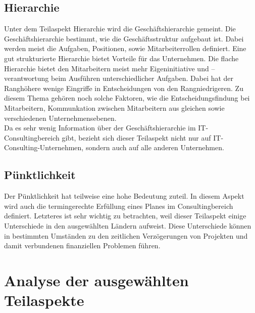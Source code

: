 \subsection*{Hierarchie}
Unter dem Teilaspekt Hierarchie wird die Geschäftshierarchie gemeint. Die Geschäftshierarchie bestimmt, wie die Geschäftsstruktur aufgebaut ist. Dabei werden meist die Aufgaben, Positionen, sowie Mitarbeiterrollen definiert. Eine gut strukturierte Hierarchie bietet Vorteile für das Unternehmen. Die flache Hierarchie bietet den Mitarbeitern meist mehr Eigeninitiative und –verantwortung beim Ausführen unterschiedlicher Aufgaben. Dabei hat der Ranghöhere wenige Eingriffe in  Entscheidungen von den Rangniedrigeren.
Zu diesem Thema gehören noch solche Faktoren, wie die Entscheidungsfindung bei Mitarbeitern, Kommunkation zwischen Mitarbeitern aus gleichen sowie verschiedenen Unternehmensebenen.\\
Da es sehr wenig Information über der Geschäftshierarchie im IT-Consultingbereich gibt, bezieht sich dieser Teilaspekt nicht nur auf IT-Consulting-Unternehmen, sondern auch auf alle anderen Unternehmen. 
\subsection*{Pünktlichkeit}
Der Pünktlichkeit hat teilweise eine hohe Bedeutung zuteil. In diesem Aspekt wird auch die termingerechte Erfüllung eines Planes im Consultingbereich definiert.  Letzteres  ist sehr wichtig zu betrachten, weil dieser Teilaspekt einige Unterschiede in den ausgewählten Ländern aufweist. Diese Unterschiede können in bestimmten Umständen zu den zeitlichen Verzögerungen von Projekten und damit verbundenen finanziellen Problemen führen.
\section{Analyse der ausgewählten Teilaspekte}
